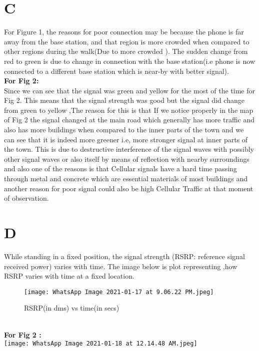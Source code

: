 \documentclass[11pt,a4paper]{article}
\begin{document}
\section{\textbf{C}}
  For Figure 1, the reasons for poor connection may be because the phone is far away from the base station, and that region is more crowded when compared to other regions during the walk(Due to more crowded ). The sudden change from red to green is due to change in connection with the base station(i.e phone is now connected to a different base station which is near-by with better signal).
\\
\textbf{For Fig 2:}\\
Since we can see that the signal was green and yellow for the most of 
the time for Fig 2. This means that the signal strength 
was good but the signal did change from green to yellow ,The reason for this is that If we
notice properly in the map of Fig 2 the signal changed at the main road which generally 
has more traffic  and also has more
buildings when compared to the inner parts of the town and we can see that it is indeed 
more greener i.e, more stronger signal at inner parts of the town. This is due to destructive
interference of the signal waves with possibly other
signal waves or also itself by means of reflection with nearby surroundings and also one of the
reasons is that  Cellular signals have a hard time passing through 
metal and concrete which are essential materials of most buildings and another reason for poor signal could also 
be high Cellular Traffic at that moment of observation.
\vspace{8pt}
\section{\textbf{D}} While standing in a fixed position, the signal strength (RSRP: reference signal received power) varies with time. The image below is plot representing ,how RSRP varies with time at a fixed location.
\begin{SCfigure}[0.5][h]
    \centering
\caption{RSRP(in dms) vs time(in secs)}
\texttt{[image: WhatsApp Image 2021-01-17 at 9.06.22 PM.jpeg]}
\end{SCfigure}\\
\textbf{For Fig 2 :}\\
\vspace{1cm}
\texttt{[image: WhatsApp Image 2021-01-18 at 12.14.48 AM.jpeg]}
\end{document}
